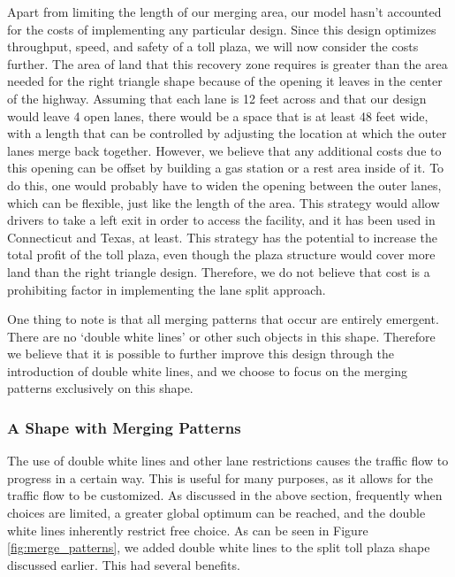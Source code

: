 \documentclass[a4paper, 11pt]{article}
\begin{document}
Apart from limiting the length of our merging area, our model hasn't accounted for the costs of implementing any particular design. Since this design optimizes throughput, speed, and safety of a toll plaza, we will now consider the costs further. The area of land that this recovery zone requires is greater than the area needed for the right triangle shape because of the opening it leaves in the center of the highway. Assuming that each lane is 12 feet across and that our design would leave 4 open lanes, there would be a space that is at least 48 feet wide, with a length that can be controlled by adjusting the location at which the outer lanes merge back together. However, we believe that any additional costs due to this opening can be offset by building a gas station or a rest area inside of it. To do this, one would probably have to widen the opening between the outer lanes, which can be flexible, just like the length of the area. This strategy would allow drivers to take a left exit in order to access the facility, and it has been used in Connecticut and Texas, at least. This strategy has the potential to increase the total profit of the toll plaza, even though the plaza structure would cover more land than the right triangle design. Therefore, we do not believe that cost is a prohibiting factor in implementing the lane split approach.  

One thing to note is that all merging patterns that occur are entirely emergent. There are no `double white lines' or other such objects in this shape. Therefore we believe that it is possible to further improve this design through the introduction of double white lines, and we choose to focus on the merging patterns exclusively on this shape. 

\subsubsection{A Shape with Merging Patterns}

The use of double white lines and other lane restrictions causes the traffic flow to progress in a certain way. This is useful for many purposes, as it allows for the traffic flow to be customized. As discussed in the above section, frequently when choices are limited, a greater global optimum can be reached, and the double white lines inherently restrict free choice. As can be seen in Figure \ref{fig:merge_patterns}, we added double white lines to the split toll plaza shape discussed earlier. This had several benefits.
\end{document}

